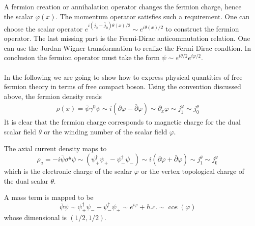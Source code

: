 A fermion creation or annihalation operator changes the fermion charge, hence the scalar $\varphi(x)$. The momentum operator satisfies such a requirement. One can choose the scalar operator $e^{i (j_0 - \bar{j}_0) \theta(x)/2} \sim e^{i \theta(x)/2}$ to construct the fermion operator. The last missing part is the Fermi-Dirac anticommutation relation. One can use the Jordan-Wigner transformation to realize the Fermi-Dirac condtion. In conclusion the fermion operator must take the form $\psi \sim e^{i\theta/2} e^{i\varphi/2}$.
\\

 \\
In the following we are going to show how to express physical quantities of free fermion theory in terms of free compact boson. Using the convention discussed above, the fermion density reads
\begin{equation}
	\begin{aligned}
		\rho(x) = \bar{\psi} \gamma^0 \psi \sim i \left(\partial \varphi - \bar{\partial} \varphi\right) \sim \partial_x \varphi \sim j_1^\varphi \sim j_0^\theta  
	\end{aligned}
\end{equation}
It is clear that the fermion charge corresponds to magnetic charge for the dual scalar field $\theta$ or the winding number of the scalar field $\varphi$. 

The axial current density maps to 
\begin{equation}
	\rho_a = -i \bar{\psi} \sigma^y \psi \sim \left( \psi^{\dagger}_{+} \psi_{+} - \psi^{\dagger}_{-}\psi_{-} \right) \sim i \left(\partial \varphi + \bar{\partial} \varphi\right) \sim j_1^\theta \sim j_0^\varphi
\end{equation}
which is the electronic charge of the scalar $\varphi$ or the vertex topological charge of the dual scalar $\theta$. 

A mass term is mapped to be 
\begin{equation}
	\bar{\psi} \psi \sim \psi_{+}^\dagger \psi_{-} + \psi_{-}^\dagger \psi_{+} \sim e^{i\varphi} + h.c. \sim \cos\left(\varphi\right)
\end{equation}
whose dimensional is $\left(1/2,1/2\right)$.


